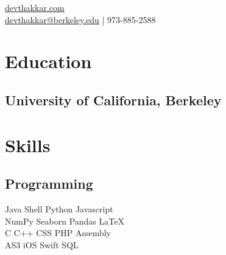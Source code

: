 \documentclass[]{deedy-resume-openfont}
\begin{document}
%
%
\lastupdated

%
%
{ \href{http://devthakkar.com}{devthakkar.com}\\
\href{mailto:devthakkar@berkeley.edu}{devthakkar@berkeley.edu} | 973-885-2588
}

%
%

\begin{minipage}[t]{0.33\textwidth} 


\section{Education} 

\subsection{University of California, Berkeley}
\sectionsep










\section{Skills}
\subsection{Programming}
Java \textbullet{}   Shell \textbullet{} Python \textbullet{} Javascript \\
NumPy \textbullet{} Seaborn \textbullet{} Pandas \textbullet{} \LaTeX\ \\ 
C \textbullet{} C++ \textbullet{} CSS \textbullet{} PHP \textbullet{} Assembly \\
AS3 \textbullet{} iOS \textbullet{} Swift \textbullet{} SQL
\sectionsep

%
%

\end{minipage} 
\end{document}
